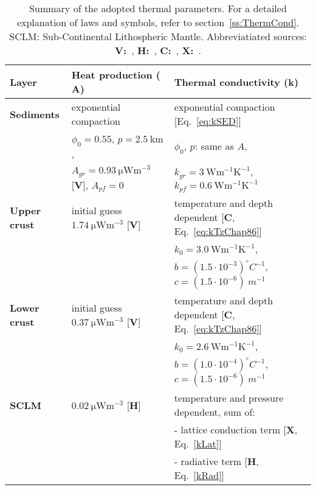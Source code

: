 \begin{table}
    \caption{Summary of the adopted thermal parameters. For a detailed explanation of laws and symbols, refer to section~\ref{ss:ThermCond}. SCLM: Sub-Continental Lithospheric Mantle. Abbreviatiated sources: \textbf{V:}~\textcite{Vila2010}, \textbf{H:}~\textcite{Hasterok2011cont}, \textbf{C:}~\textcite{Chapman1986}, \textbf{X:}~\textcite{Xu2004}.}
    \begin{adjustbox}{center}
    \begingroup\setlength{\fboxsep}{0pt}
    \colorbox{tablebackground}{%
	\begin{tabular}{lll}
		\hline
		 \textbf{Layer} & \textbf{Heat production ($\mathbf{A}$)} & \textbf{Thermal conductivity ($\mathbf{k}$)} \\
		\hline
		\textbf{Sediments} & exponential compaction & exponential compaction [Eq.~\ref{eq:kSED}] \\
		& $\phi_0=0.55$, $p=2.5~\mathrm{km}$, & $\phi_0$, $p$: same as $A$, \\
		& $A_{gr} = 0.93~\mathrm{\mu W m^{-3}}$ [\textbf{V}], $A_{pf} = 0$ & $k_{gr} = 3~\mathrm{W m^{-1} K^{-1}}$, $k_{pf} = 0.6~\mathrm{W m^{-1} K^{-1}}$ \\
		\hline
		\textbf{Upper crust} & initial guess $1.74~\mathrm{\mu W m^{-3}}$ [\textbf{V}] & temperature and depth dependent [\textbf{C}, Eq.~\ref{eq:kTzChap86}] \\
		& & $k_0=3.0~\mathrm{W m^{-1} K^{-1}}$, \\
		& & $b=(1.5 \cdot 10^{-3})^{\circ}C^{-1}$, $c=(1.5 \cdot 10^{-6})~m^{-1}$ \\
		\hline
		\textbf{Lower crust} & initial guess $0.37~\mathrm{\mu W m^{-3}}$ [\textbf{V}] & temperature and depth dependent [\textbf{C}, Eq.~\ref{eq:kTzChap86}]\\
		& & $k_0=2.6~\mathrm{W m^{-1} K^{-1}}$, \\
		& & $b=(1.0 \cdot 10^{-4})^{\circ}C^{-1}$, $c=(1.5 \cdot 10^{-6})~m^{-1}$ \\
		\hline
		\textbf{SCLM} & $0.02~\mathrm{\mu W m^{-3}}$ [\textbf{H}] & temperature and pressure dependent, sum of: \\
		& & - lattice conduction term [\textbf{X}, Eq.~\ref{kLat}] \\
		& & - radiative term [\textbf{H}, Eq.~\ref{kRad}] \\
		\hline
    \end{tabular}
    }\endgroup
    \end{adjustbox}
	\label{tab:ThermParams}
\end{table}

